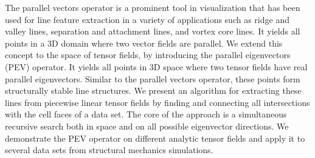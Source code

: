 
%
The parallel vectors operator is a prominent tool in visualization that has been
used for line feature extraction in a variety of applications such as ridge and
valley lines, separation and attachment lines, and vortex core lines.
%
It yields all points in a 3D domain where two vector fields are parallel.
%
We extend this concept to the space of tensor fields, by introducing the
parallel eigenvectors (PEV) operator.
%
It yields all points in 3D space where two tensor fields have real parallel
eigenvectors.
%
Similar to the parallel vectors operator, these points form structurally stable
line structures.
%
We present an algorithm for extracting these lines from piecewise linear tensor
fields by finding and connecting all intersections with the cell faces of a data
set.
%
The core of the approach is a simultaneous recursive search both in space and on
all possible eigenvector directions.
%
We demonstrate the PEV operator on different analytic tensor fields and apply it
to several data sets from structural mechanics simulations.
%